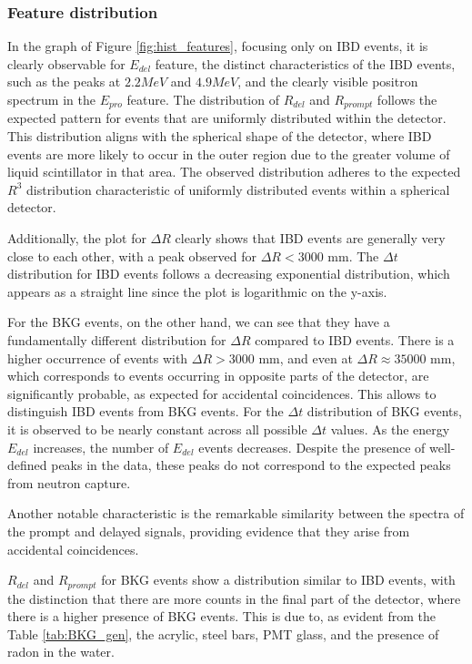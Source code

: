 \subsubsection*{Feature distribution}
In the graph of Figure \ref{fig:hist_features}, focusing only on IBD events, it is clearly observable for $E_{del}$ feature, the distinct characteristics of the IBD events, such as the peaks at $2.2 MeV$ and $4.9 MeV$, and the clearly visible positron spectrum in the $E_{pro}$ feature. The distribution of $R_{del}$ and $R_{prompt}$ follows the expected pattern for events that are uniformly distributed within the detector. This distribution aligns with the spherical shape of the detector, where IBD events are more likely to occur in the outer region due to the greater volume of liquid scintillator in that area. The observed distribution adheres to the expected $R^3$ distribution characteristic of uniformly distributed events within a spherical detector.

Additionally, the plot for \( \Delta R \) clearly shows that IBD events are generally very close to each other, with a peak observed for \( \Delta R < 3000 \) mm. The \( \Delta t \) distribution for IBD events follows a decreasing exponential distribution, which appears as a straight line since the plot is logarithmic on the y-axis.

For the BKG events, on the other hand, we can see that they have a fundamentally different distribution for \( \Delta R \) compared to IBD events. There is a higher occurrence of events with \( \Delta R > 3000 \) mm, and even at \( \Delta R \approx 35000 \) mm, which corresponds to events occurring in opposite parts of the detector, are significantly probable, as expected for accidental coincidences. This allows to distinguish IBD events from BKG events. For the \( \Delta t \) distribution of BKG events, it is observed to be nearly constant across all possible \( \Delta t \) values. As the energy \( E_{del} \) increases, the number of \( E_{del} \) events decreases. Despite the presence of well-defined peaks in the data, these peaks do not correspond to the expected peaks from neutron capture.

Another notable characteristic is the remarkable similarity between the spectra of the prompt and delayed signals, providing evidence that they arise from accidental coincidences.

\( R_{del} \) and \( R_{prompt} \) for BKG events show a distribution similar to IBD events, with the distinction that there are more counts in the final part of the detector, where there is a higher presence of BKG events. This is due to, as evident from the Table \ref{tab:BKG_gen}, the acrylic, steel bars, PMT glass, and the presence of radon in the water.

